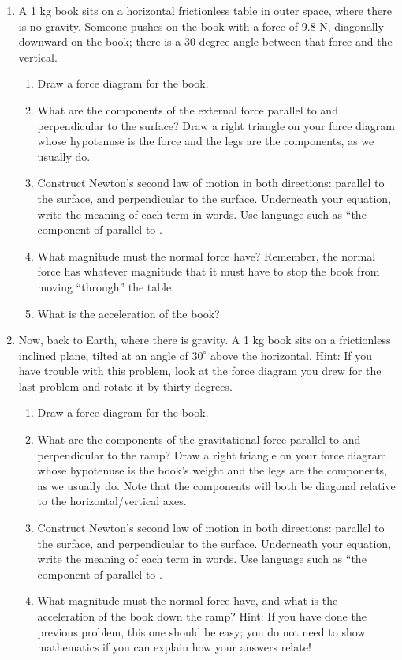 \documentclass[12pt]{article}
\begin{document}
\begin{enumerate}
\item{A 1 kg book sits on a horizontal frictionless table in outer space, where there is no
 	gravity. Someone pushes on the book with a force of 9.8 N, diagonally downward on the book; there is a 30 degree
 	angle between that force and the vertical.}

 	\begin{enumerate}
\item{Draw a force diagram for the book. }
\item{What are the components of the external force parallel to and perpendicular to
 	the surface? Draw a right triangle on your force diagram whose hypotenuse is the
 	force and the legs are the components, as we usually do.}
\item Construct Newton's second law of motion in both directions: parallel to the surface, and perpendicular to the surface. 
Underneath your equation, write the meaning of each term in words. Use language such as ``the component of \underline{\hspace{0.5in}} parallel to \underline{\hspace{0.5in}}.


\item{What magnitude must the normal force have? Remember, the normal force has
 	whatever magnitude that it must have to stop the book from moving ``through''
 	the table.}
\item{What is the acceleration of the book?}
\end{enumerate}

\item{Now, back to Earth, where there is gravity. A 1 kg book sits on a frictionless inclined
 	plane, tilted at an angle of $30^\circ$ above the horizontal. Hint: If you have trouble with
 	this problem, look at the force diagram you drew for the last problem and rotate it by
 	thirty degrees. }
\begin{enumerate}
\item{Draw a force diagram for the book. }
\item{What are the components of the gravitational force parallel to and perpendicular
 	to the ramp? Draw a right triangle on your force diagram whose hypotenuse is
 	the book’s weight and the legs are the components, as we usually do. Note that
 	the components will both be diagonal relative to the horizontal/vertical axes. }
\item Construct Newton's second law of motion in both directions: parallel to the surface, and perpendicular to the surface. 
Underneath your equation, write the meaning of each term in words. Use language such as ``the component of \underline{\hspace{0.5in}} parallel to \underline{\hspace{0.5in}}.
\item{What magnitude must the normal force have, and what is the acceleration of the book down the ramp? Hint: If you have done the
 	previous problem, this one should be easy; you do not need to show mathematics
 	if you can explain how your answers relate!}
\end{enumerate}
 

\end{enumerate}
\end{document}
